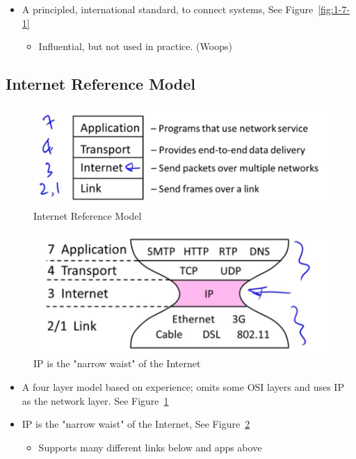 \documentclass[12pt]{ctexart}   %
\begin{document}
	\begin{itemize}
		\item A principled, international standard, to connect systems, See Figure~\ref{fig:1-7-1}
		\begin{itemize}
			\item Influential, but not used in practice. (Woops)
		\end{itemize}
	\end{itemize}
	
	\subsection{Internet Reference Model}
	
	\begin{figure}[h!] %
	 \centering
	 \includegraphics[scale=0.7]{images/1-7-2}
	\caption{ Internet Reference Model}
	 \label{fig:1-7-2}
	 \end{figure}
	 
	 \begin{figure}[h!] %
	 \centering
	 \includegraphics[scale=0.7]{images/1-7-3}
	\caption{ IP is the "narrow waist" of the Internet}
	 \label{fig:1-7-3}
	 \end{figure}
	 
	\begin{itemize}
		\item A four layer model based on experience; omits some OSI layers and uses IP as the network layer. See Figure~\ref{fig:1-7-2}
		
		\item IP is the "narrow waist" of the Internet, See Figure~\ref{fig:1-7-3}
		\begin{itemize}
			\item Supports many different links below and apps above
		\end{itemize}
	\end{itemize}
	
\end{document}
